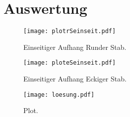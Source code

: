 \section{Auswertung}
\label{sec:Auswertung}

\begin{figure}
  \centering
  \texttt{[image: plotrSeinseit.pdf]}
  \caption{Einseitiger Aufhang Runder Stab.}
  \label{fig:plotrSeinseit}
\end{figure}

\begin{figure}
  \centering
  \texttt{[image: ploteSeinseit.pdf]}
  \caption{Einseitiger Aufhang Eckiger Stab.}
  \label{fig:ploteSeinseit}
\end{figure}

\begin{figure}
  \centering
  \texttt{[image: loesung.pdf]}
  \caption{Plot.}
  \label{fig:plotbeidseitig}
\end{figure}




